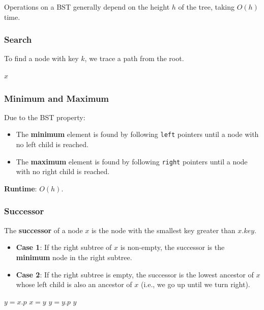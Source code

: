 \documentclass[12pt]{article}
\theoremstyle{blueplain}
\theoremstyle{bluedef}
\theoremstyle{blueremark}
\begin{document}
Operations on a BST generally depend on the height $h$ of the tree, taking $O(h)$ time.

\subsubsection{Search}
To find a node with key $k$, we trace a path from the root.
\begin{algorithm}
    \caption{Tree Search}\label{alg:treeSearch}
    \begin{algorithmic}[1]
        \State \Return $x$
        \EndIf
        \State \Return {}
        \Else
        \State \Return {}
        \EndIf
        \EndProcedure
    \end{algorithmic}
\end{algorithm}

\subsubsection{Minimum and Maximum}
Due to the BST property:
\begin{itemize}
    \item The \textbf{minimum} element is found by following \texttt{left} pointers until a node with no left child is reached.
    \item The \textbf{maximum} element is found by following \texttt{right} pointers until a node with no right child is reached.
\end{itemize}
\textbf{Runtime}: $O(h)$.

\subsubsection{Successor}
The \textbf{successor} of a node $x$ is the node with the smallest key greater than $x.key$.
\begin{itemize}
    \item \textbf{Case 1}: If the right subtree of $x$ is non-empty, the successor is the \textbf{minimum} node in the right subtree.
    \item \textbf{Case 2}: If the right subtree is empty, the successor is the lowest ancestor of $x$ whose left child is also an ancestor of $x$ (i.e., we go up until we turn right).
\end{itemize}

\begin{algorithm}
    \caption{Tree Successor}\label{alg:successor}
    \begin{algorithmic}[1]
        \State \Return {}
        \EndIf
        \State $y = x.p$
         
        \State $x = y$
        \State $y = y.p$
        \EndWhile
        \State \Return $y$
        \EndProcedure
    \end{algorithmic}
\end{algorithm}
\end{document}
